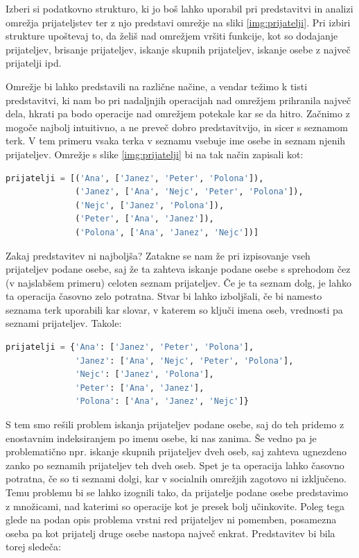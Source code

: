 \begin{zgled}
Izberi si podatkovno strukturo, ki jo boš lahko uporabil pri predstavitvi in analizi omrežja prijateljstev ter z njo predstavi omrežje na sliki \ref{img:prijatelji}. Pri izbiri strukture upoštevaj to, da želiš nad omrežjem vršiti funkcije, kot so dodajanje prijateljev, brisanje prijateljev, iskanje skupnih prijateljev, iskanje osebe z največ prijatelji ipd.
\end{zgled}
\begin{resitev}
Omrežje bi lahko predstavili na različne načine, a vendar težimo k tisti predstavitvi, ki nam bo pri nadaljnjih operacijah nad omrežjem prihranila največ dela, hkrati pa bodo operacije nad omrežjem potekale kar se da hitro. Začnimo z mogoče najbolj intuitivno, a ne preveč dobro predstavitvijo, in sicer s seznamom terk. V tem primeru vsaka terka v seznamu vsebuje ime osebe in seznam njenih prijateljev. Omrežje s slike \ref{img:prijatelji} bi na tak način zapisali kot:
\begin{lstlisting}[language=Python, showstringspaces=false]
prijatelji = [('Ana', ['Janez', 'Peter', 'Polona']),
              ('Janez', ['Ana', 'Nejc', 'Peter', 'Polona']),
              ('Nejc', ['Janez', 'Polona']),
              ('Peter', ['Ana', 'Janez']),
              ('Polona', ['Ana', 'Janez', 'Nejc'])]
\end{lstlisting}
Zakaj predstavitev ni najboljša? Zatakne se nam že pri izpisovanje vseh prijateljev podane osebe, saj že ta zahteva iskanje podane osebe s sprehodom čez (v najslabšem primeru) celoten seznam prijateljev. Če je ta seznam dolg, je lahko ta operacija časovno zelo potratna. Stvar bi lahko izboljšali, če bi namesto seznama terk uporabili kar slovar, v katerem so ključi imena oseb, vrednosti pa seznami prijateljev. Takole: 
\begin{lstlisting}[language=Python, showstringspaces=false]
prijatelji = {'Ana': ['Janez', 'Peter', 'Polona'],
              'Janez': ['Ana', 'Nejc', 'Peter', 'Polona'],
              'Nejc': ['Janez', 'Polona'],
              'Peter': ['Ana', 'Janez'],
              'Polona': ['Ana', 'Janez', 'Nejc']}
\end{lstlisting}
S tem smo rešili problem iskanja prijateljev podane osebe, saj do teh pridemo z enostavnim indeksiranjem po imenu osebe, ki nas zanima. Še vedno pa je problematično npr. iskanje skupnih prijateljev dveh oseb, saj zahteva ugnezdeno zanko po seznamih prijateljev teh dveh oseb. Spet je ta operacija lahko časovno potratna, če so ti seznami dolgi, kar v socialnih omrežjih zagotovo ni izključeno. Temu problemu bi se lahko izognili tako, da prijatelje podane osebe predstavimo z množicami, nad katerimi so operacije kot je presek bolj učinkovite. Poleg tega glede na podan opis problema vrstni red prijateljev ni pomemben, posamezna oseba pa kot prijatelj druge osebe nastopa največ enkrat. Predstavitev bi bila torej sledeča:

\end{resitev}

